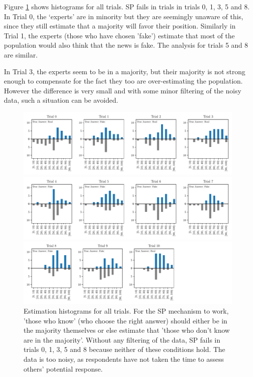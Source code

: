 \documentclass{report}
\theoremstyle{definition}
\begin{document}
Figure \ref{fig:exp1_estim_all} shows histograms for all trials. SP fails in trials in trials 0, 1, 3, 5 and 8. In Trial 0, the `experts' are in minority but they are seemingly unaware of this, since they still estimate that a majority will favor their position. Similarly in Trial 1, the experts (those who have chosen 'fake') estimate that most of the population would also think that the news is fake. The analysis for trials 5 and 8 are similar. 

In Trial 3, the experts seem to be in a majority, but their majority is not strong enough to compensate for the fact they too are over-estimating the population. However the difference is very small and with some minor filtering of the noisy data, such a situation can be avoided.

\begin{figure}
    \centering
    \centerline{\includegraphics[width=1.5\textwidth]{exp1_estim_0-3.pdf}}
    \centerline{\includegraphics[width=1.5\textwidth]{exp1_estim_4-7.pdf}}
    \centerline{\includegraphics[width=1.5\textwidth]{exp1_estim_8-10.pdf}}
    \caption{Estimation histograms for all trials. For the SP mechanism to work, 'those who know' (who choose the right answer) should either be in the majority themselves or else estimate that 'those who don't know are in the majority'. Without any filtering of the data, SP fails in trials 0, 1, 3, 5 and 8 because neither of these conditions hold. The data is too noisy, as respondents have not taken the time to assess others' potential response.}
    \label{fig:exp1_estim_all}
\end{figure}
\end{document}
